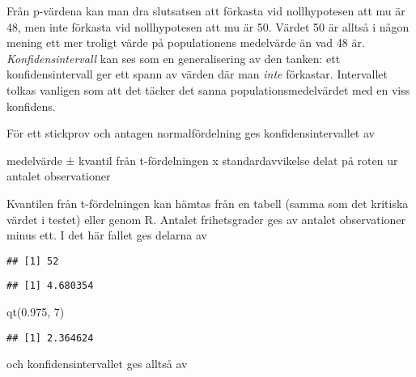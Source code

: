 \documentclass[
]{book}
\newenvironment{Shaded}{\begin{snugshade}}{\end{snugshade}}
\newcommand{\DecValTok}[1]{\textcolor[rgb]{0.00,0.00,0.81}{#1}}
\newcommand{\FloatTok}[1]{\textcolor[rgb]{0.00,0.00,0.81}{#1}}
\newcommand{\FunctionTok}[1]{\textcolor[rgb]{0.00,0.00,0.00}{#1}}
\newcommand{\NormalTok}[1]{#1}
\newcommand{\SpecialCharTok}[1]{\textcolor[rgb]{0.00,0.00,0.00}{#1}}
\theoremstyle{definition}
\theoremstyle{definition}
\theoremstyle{definition}
\theoremstyle{definition}
\theoremstyle{remark}
\begin{document}
Från p-värdena kan man dra slutsatsen att förkasta vid nollhypotesen att mu är 48, men inte förkasta vid nollhypotesen att mu är 50. Värdet 50 är alltså i någon mening ett mer troligt värde på populationens medelvärde än vad 48 är. \emph{Konfidensintervall} kan ses som en generalisering av den tanken: ett konfidensintervall ger ett spann av värden där man \emph{inte} förkastar. Intervallet tolkas vanligen som att det täcker det sanna populationsmedelvärdet med en viss konfidens.

För ett stickprov och antagen normalfördelning ges konfidensintervallet av

medelvärde ± kvantil från t-fördelningen x standardavvikelse delat på roten ur antalet observationer

Kvantilen från t-fördelningen kan hämtas från en tabell (samma som det kritiska värdet i testet) eller genom R. Antalet frihetsgrader ges av antalet observationer minus ett. I det här fallet ges delarna av

\begin{Shaded}
\end{Shaded}

\begin{verbatim}
## [1] 52
\end{verbatim}

\begin{Shaded}
\end{Shaded}

\begin{verbatim}
## [1] 4.680354
\end{verbatim}

\begin{Shaded}
\begin{Highlighting}[]
\FunctionTok{qt}\NormalTok{(}\FloatTok{0.975}\NormalTok{, }\DecValTok{7}\NormalTok{)}
\end{Highlighting}
\end{Shaded}

\begin{verbatim}
## [1] 2.364624
\end{verbatim}

och konfidensintervallet ges alltså av
\end{document}
